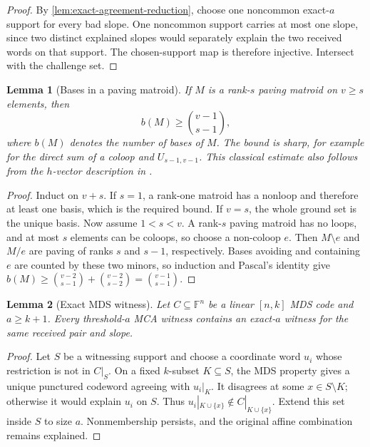 \documentclass[11pt,a4paper]{amsart}
\numberwithin{equation}{section}
\newtheorem{lemma}[lemma]{Lemma}
\theoremstyle{remark}
\newcommand{\F}{\mathbb F}
\begin{document}
\begin{proof}
By \cref{lem:exact-agreement-reduction}, choose one noncommon exact-\(a\)
support for every bad slope.  One noncommon support carries at most one
slope, since two distinct explained slopes would separately explain the
two received words on that support.  The chosen-support map is therefore
injective.  Intersect with the challenge set.
\end{proof}


\begin{lemma}[Bases in a paving matroid]\label{lem:paving-bases}
If \(M\) is a rank-\(s\) paving matroid on \(v\ge s\) elements, then
\[
                         b(M)\ge\binom{v-1}{s-1},  \tag{2.3}
 \label{eq:paving-bases}
\]
where \(b(M)\) denotes the number of bases of \(M\).
The bound is sharp, for example for the direct sum of a coloop and
\(U_{s-1,v-1}\).  This classical estimate also follows from the
\(h\)-vector description in \cite[Prop.~3.1]{MNRI11}.
\end{lemma}

\begin{proof}
Induct on \(v+s\).  If \(s=1\), a rank-one matroid has a nonloop and
therefore at least one basis, which is the required bound.  If \(v=s\),
the whole ground set is the unique basis.  Now assume \(1<s<v\).
A rank-\(s\) paving matroid has no loops, and at most \(s\) elements can
be coloops, so choose a non-coloop \(e\).  Then \(M\setminus e\) and
\(M/e\) are paving of ranks \(s\) and \(s-1\), respectively.  Bases
avoiding and containing \(e\) are counted by these two minors, so
induction and Pascal's identity give
\(b(M)\ge\binom{v-2}{s-1}+\binom{v-2}{s-2}
=\binom{v-1}{s-1}\).
\end{proof}

\begin{lemma}[Exact MDS witness]\label{lem:exact-mds-witness}
Let \(C\subseteq\F^n\) be a linear \([n,k]\) MDS code and \(a\ge k+1\).
Every threshold-\(a\) MCA witness contains an exact-\(a\) witness for the
same received pair and slope.
\end{lemma}

\begin{proof}
Let \(S\) be a witnessing support and choose a coordinate word \(u_i\)
whose restriction is not in \(C|_S\).  On a fixed \(k\)-subset
\(K\subseteq S\), the MDS property gives a unique punctured codeword
agreeing with \(u_i|_K\).  It disagrees at some \(x\in S\setminus K\);
otherwise it would explain \(u_i\) on \(S\).  Thus
\(u_i|_{K\cup\{x\}}\notin C|_{K\cup\{x\}}\).  Extend this set inside
\(S\) to size \(a\).  Nonmembership persists, and the original affine
combination remains explained.
\end{proof}
\end{document}
